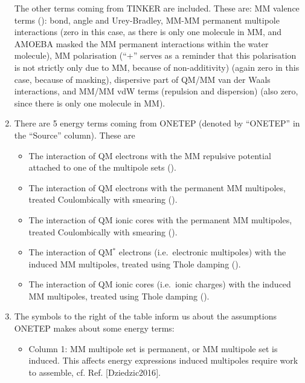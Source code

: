 \documentclass[letterpaper,10pt,english]{sphinxmanual}
\begin{document}
\begin{enumerate}
The other terms coming from TINKER are included. These are: MM
valence terms (): bond, angle and Urey-Bradley, MM-MM
permanent multipole interactions (zero in this case, as there is only
one molecule in MM, and AMOEBA masked the MM permanent interactions
within the water molecule), MM polarisation (“+” serves as a reminder
that this polarisation is not strictly only due to MM, because of
non-additivity) (again zero in this case, because of masking),
dispersive part of QM/MM van der Waals interactions, and MM/MM vdW
terms (repulsion and dispersion) (also zero, since there is only one
molecule in MM).

\item {} 
There are 5 energy terms coming from ONETEP (denoted by “ONETEP” in
the “Source” column). These are
\begin{itemize}
\item {} 
The interaction of QM electrons with the MM repulsive potential
attached to one of the multipole sets ().

\item {} 
The interaction of QM electrons with the permanent MM multipoles,
treated Coulombically with smearing ().

\item {} 
The interaction of QM ionic cores with the permanent MM
multipoles, treated Coulombically with smearing ().

\item {} 
The interaction of QM\(^*\) electrons (i.e. electronic
multipoles) with the induced MM multipoles, treated using Thole
damping ().

\item {} 
The interaction of QM ionic cores (i.e. ionic charges) with the
induced MM multipoles, treated using Thole damping ().

\end{itemize}

\item {} 
The symbols to the right of the table inform us about the assumptions
ONETEP makes about some energy terms:
\begin{itemize}
\item {} 
Column 1:  \textendash{} MM multipole set is permanent, or  \textendash{} MM
multipole set is induced. This affects energy expressions \textendash{}
induced multipoles require work to assemble,
cf. Ref. {[}Dziedzic2016{]}.


\end{itemize}
\end{enumerate}
\end{document}
